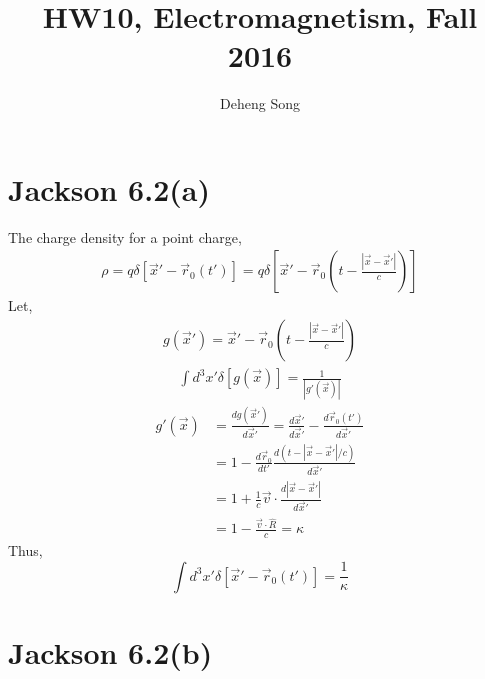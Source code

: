 \documentclass{article}
\begin{document}
\title{HW10, Electromagnetism, Fall 2016}
\author{Deheng Song}
\maketitle

\section*{Jackson 6.2(a)}

The charge density for a point charge,
\begin{align*}
  \rho=q\delta[\vec x'-\vec r_0(t')]=q\delta[\vec x'-\vec r_0(t-\frac{|\vec x-\vec x'|}{c})]
\end{align*}
Let,
\begin{align*}
  g(\vec x')=\vec x'-\vec r_0(t-\frac{|\vec x-\vec x'|}{c})
\end{align*}
\begin{align*}
  \int d^3x'\delta[g(\vec x)]=\frac{1}{|g'(\vec x)|}
\end{align*}
\begin{align*}
  g'(\vec x)&=\frac{dg(\vec x')}{d\vec x'}=\frac{d\vec x'}{d\vec x'}-\frac{d\vec r_0(t')}{d\vec x'}\\
            &=1-\frac{d\vec r_0}{dt'}\frac{d(t-|\vec x-\vec x'|/c)}{d\vec x'}\\
            &=1+\frac{1}{c}\vec v\cdot\frac{d|\vec x-\vec x'|}{d\vec x'}\\
            &=1-\frac{\vec v\cdot\hat R}{c}=\kappa
\end{align*}
Thus,
\[ \boxed{\int d^3x'\delta[\vec x'-\vec r_0(t')]=\frac{1}{\kappa}}\]
\pagebreak

\section*{Jackson 6.2(b)}
\end{document}
